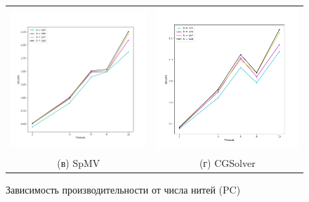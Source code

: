 \documentclass[12pt, a4paper]{article}
\begin{document}
\begin{figure}[H]
\begin{tabular}{cc}
		\includegraphics[width=85mm]{multithread_pc_spmv} & \includegraphics[width=85mm]{multithread_pc_cgsolver} \\
		(в) SpMV & (г) CGSolver \\[6pt]
	\end{tabular}
	\caption{Зависимость производительности от числа нитей (PC)}
	\label{fig:multithread_flops_pc} 
\end{figure}
\end{document}

